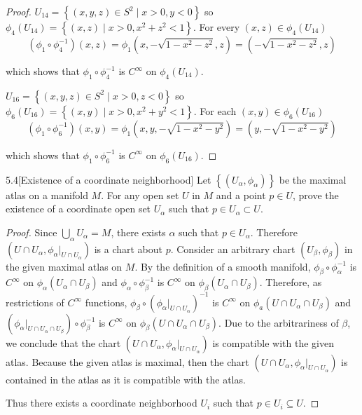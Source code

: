 \begin{proof}
	\( U_{14} = \left\{ (x, y, z) \in S^{2} \mid x > 0, y < 0 \right\} \) so \( \phi_{4}(U_{14}) = \left\{ (x, z) \mid x > 0, x^{2} + z^{2} < 1 \right\} \). For every \( (x, z) \in \phi_{4}(U_{14}) \)
	\[
		(\phi_{1}\circ \phi_{4}^{-1})(x, z) = \phi_{1}(x, -\sqrt{1 - x^{2} - z^{2}}, z) = (-\sqrt{1 - x^{2} - z^{2}}, z)
	\]

	which shows that \( \phi_{1} \circ \phi_{4}^{-1} \) is \( C^{\infty} \) on \( \phi_{4}(U_{14}) \).

	\( U_{16} = \left\{ (x, y, z) \in S^{2} \mid x > 0, z < 0 \right\} \) so \( \phi_{6}(U_{16}) = \left\{ (x, y) \mid x > 0, x^{2} + y^{2} < 1 \right\} \). For each \( (x, y) \in \phi_{6}(U_{16}) \)
	\[
		(\phi_{1}\circ \phi_{6}^{-1})(x, y) = \phi_{1}(x, y, -\sqrt{1 - x^{2} - y^{2}}) = (y, -\sqrt{1 - x^{2} - y^{2}})
	\]

	which shows that \( \phi_{1}\circ \phi_{6}^{-1} \) is \( C^{\infty} \) on \( \phi_{6}(U_{16}) \).
\end{proof}

\begin{problem}{5.4}[Existence of a coordinate neighborhood]
Let \( \left\{ (U_{\alpha}, \phi_{\alpha}) \right\} \) be the maximal atlas on a manifold \( M \). For any open set \( U \) in \( M \) and a point \( p \in U \), prove the existence of a coordinate open set \( U_{\alpha} \) such that \( p \in U_{\alpha} \subset U \).
\end{problem}

\begin{proof}
	Since \( \bigcup_{\alpha} U_{\alpha} = M \), there exists \( \alpha \) such that \( p \in U_{\alpha} \). Therefore \( (U \cap U_{\alpha}, \phi_{\alpha}\vert_{U \cap U_{\alpha}}) \) is a chart about \( p \). Consider an arbitrary chart \( (U_{\beta}, \phi_{\beta}) \) in the given maximal atlas on \( M \). By the definition of a smooth manifold, \( \phi_{\beta} \circ \phi_{\alpha}^{-1} \) is \( C^{\infty} \) on \( \phi_{\alpha}(U_{\alpha} \cap U_{\beta}) \) and \( \phi_{\alpha} \circ \phi_{\beta}^{-1} \) is \( C^{\infty} \) on \( \phi_{\beta}(U_{\alpha}\cap U_{\beta}) \). Therefore, as restrictions of \( C^{\infty} \) functions, \( \phi_{\beta} \circ {(\phi_{\alpha}\vert_{U\cap U_{\alpha}})}^{-1} \) is \( C^{\infty} \) on \( \phi_{a}(U \cap U_{\alpha} \cap U_{\beta}) \) and \( {(\phi_{\alpha}\vert_{U\cap U_{\alpha} \cap U_{\beta}})} \circ \phi_{\beta}^{-1} \) is \( C^{\infty} \) on \( \phi_{\beta}(U \cap U_{\alpha} \cap U_{\beta}) \). Due to the arbitrariness of \( \beta \), we conclude that the chart \( (U \cap U_{\alpha}, \phi_{\alpha}\vert_{U\cap U_{\alpha}}) \) is compatible with the given atlas. Because the given atlas is maximal, then the chart \( (U \cap U_{\alpha}, \phi_{\alpha}\vert_{U \cap U_{\alpha}}) \) is contained in the atlas as it is compatible with the atlas.

	Thus there exists a coordinate neighborhood \( U_{i} \) such that \( p \in U_{i} \subseteq U \).
\end{proof}

